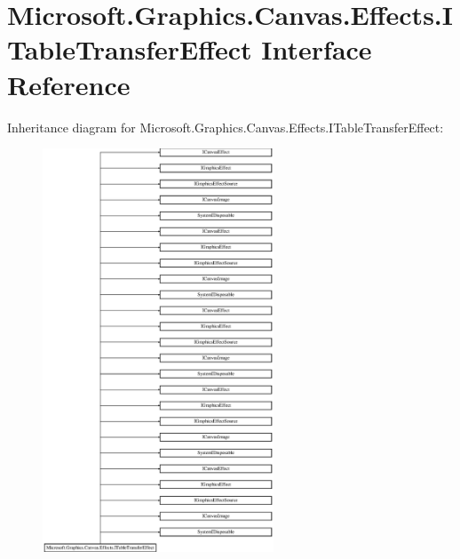 \hypertarget{interface_microsoft_1_1_graphics_1_1_canvas_1_1_effects_1_1_i_table_transfer_effect}{}\section{Microsoft.\+Graphics.\+Canvas.\+Effects.\+I\+Table\+Transfer\+Effect Interface Reference}
\label{interface_microsoft_1_1_graphics_1_1_canvas_1_1_effects_1_1_i_table_transfer_effect}
Inheritance diagram for Microsoft.\+Graphics.\+Canvas.\+Effects.\+I\+Table\+Transfer\+Effect\+:\begin{figure}[H]
\begin{center}
\leavevmode
\includegraphics[height=12.000000cm]{interface_microsoft_1_1_graphics_1_1_canvas_1_1_effects_1_1_i_table_transfer_effect}
\end{center}
\end{figure}

